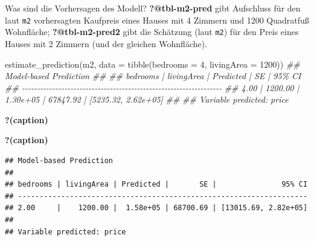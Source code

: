 \documentclass[
  a4paper,
  DIV=11]{scrreprt}
\newenvironment{Shaded}{\begin{snugshade}}{\end{snugshade}}
\newcommand{\AttributeTok}[1]{\textcolor[rgb]{0.40,0.45,0.13}{#1}}
\newcommand{\DecValTok}[1]{\textcolor[rgb]{0.68,0.00,0.00}{#1}}
\newcommand{\DocumentationTok}[1]{\textcolor[rgb]{0.37,0.37,0.37}{\textit{#1}}}
\newcommand{\FunctionTok}[1]{\textcolor[rgb]{0.28,0.35,0.67}{#1}}
\newcommand{\NormalTok}[1]{\textcolor[rgb]{0.00,0.23,0.31}{#1}}
\theoremstyle{definition}
\theoremstyle{remark}
\begin{document}
Was sind die Vorhersagen des Modell? \textbf{?@tbl-m2-pred} gibt
Aufschluss für den laut \texttt{m2} vorhersagten Kaufpreis eines Hauses
mit 4 Zimmern und 1200 Quadratfuß Wohnfläche; \textbf{?@tbl-m2-pred2}
gibt die Schätzung (laut \texttt{m2}) für den Preis eines Hauses mit 2
Zimmern (und der gleichen Wohnfläche).

\begin{Shaded}
\begin{Highlighting}[]
\FunctionTok{estimate\_prediction}\NormalTok{(m2, }\AttributeTok{data =} \FunctionTok{tibble}\NormalTok{(}\AttributeTok{bedrooms =} \DecValTok{4}\NormalTok{, }\AttributeTok{livingArea =} \DecValTok{1200}\NormalTok{))}
\DocumentationTok{\#\# Model{-}based Prediction}
\DocumentationTok{\#\# }
\DocumentationTok{\#\# bedrooms | livingArea | Predicted |       SE |              95\% CI}
\DocumentationTok{\#\# {-}{-}{-}{-}{-}{-}{-}{-}{-}{-}{-}{-}{-}{-}{-}{-}{-}{-}{-}{-}{-}{-}{-}{-}{-}{-}{-}{-}{-}{-}{-}{-}{-}{-}{-}{-}{-}{-}{-}{-}{-}{-}{-}{-}{-}{-}{-}{-}{-}{-}{-}{-}{-}{-}{-}{-}{-}{-}{-}{-}{-}{-}{-}{-}{-}{-}}
\DocumentationTok{\#\# 4.00     |    1200.00 |  1.30e+05 | 67847.92 | [5235.32, 2.62e+05]}
\DocumentationTok{\#\# }
\DocumentationTok{\#\# Variable predicted: price}
\end{Highlighting}
\end{Shaded}

\begin{table}

\caption{\textbf{?(caption)}}

\end{table}

\begin{table}

\caption{\textbf{?(caption)}}\begin{minipage}[t]{\linewidth}

{\centering 

\begin{verbatim}
## Model-based Prediction
## 
## bedrooms | livingArea | Predicted |       SE |               95% CI
## -------------------------------------------------------------------
## 2.00     |    1200.00 |  1.58e+05 | 68700.69 | [13015.69, 2.82e+05]
## 
## Variable predicted: price
\end{verbatim}

}

\end{minipage}%

\end{table}
\end{document}
